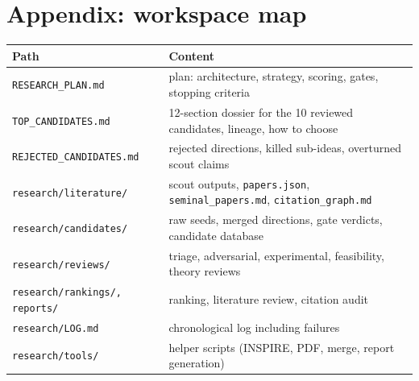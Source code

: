 \documentclass[11pt,a4paper]{article}
\begin{document}
\section*{Appendix: workspace map}
\begin{small}\begin{tabular}{@{}p{5.2cm}p{9.5cm}@{}}\toprule Path & Content\\\midrule
\texttt{RESEARCH\_PLAN.md} & plan: architecture, strategy, scoring, gates, stopping criteria\\
\texttt{TOP\_CANDIDATES.md} & 12-section dossier for the 10 reviewed candidates, lineage, how to choose\\
\texttt{REJECTED\_CANDIDATES.md} & rejected directions, killed sub-ideas, overturned scout claims\\
\texttt{research/literature/} & scout outputs, \texttt{papers.json}, \texttt{seminal\_papers.md}, \texttt{citation\_graph.md}\\
\texttt{research/candidates/} & raw seeds, merged directions, gate verdicts, candidate database\\
\texttt{research/reviews/} & triage, adversarial, experimental, feasibility, theory reviews\\
\texttt{research/rankings/, reports/} & ranking, literature review, citation audit\\
\texttt{research/LOG.md} & chronological log including failures\\
\texttt{research/tools/} & helper scripts (INSPIRE, PDF, merge, report generation)\\
\bottomrule\end{tabular}\end{small}
\end{document}
